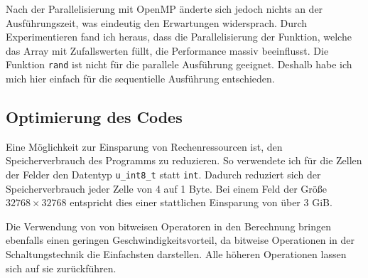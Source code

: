 \documentclass[german,plainarticle,hyperref,utf8]{zihpub}
\begin{document}
	Nach der Parallelisierung mit OpenMP änderte sich jedoch nichts an der Ausführungszeit, was eindeutig den Erwartungen widersprach. Durch Experimentieren fand ich heraus, dass die Parallelisierung der Funktion, welche das Array mit Zufallswerten füllt, die Performance massiv beeinflusst. Die Funktion \verb|rand| ist nicht für die parallele Ausführung geeignet. Deshalb habe ich mich hier einfach für die sequentielle Ausführung entschieden.
	
	\subsection{Optimierung des Codes}
	Eine Möglichkeit zur Einsparung von Rechenressourcen ist, den Speicherverbrauch des Programms zu reduzieren. So verwendete ich für die Zellen der Felder den Datentyp \verb|u_int8_t| statt \verb|int|. Dadurch reduziert sich der Speicherverbrauch jeder Zelle von 4 auf 1 Byte. Bei einem Feld der Größe $32768\times 32768$ entspricht dies einer stattlichen Einsparung von über 3 GiB.
	
	Die Verwendung von von bitweisen Operatoren in den Berechnung bringen ebenfalls einen geringen Geschwindigkeitsvorteil, da bitweise Operationen in der Schaltungstechnik die Einfachsten darstellen. Alle höheren Operationen lassen sich auf sie zurückführen.
	

\end{document}
